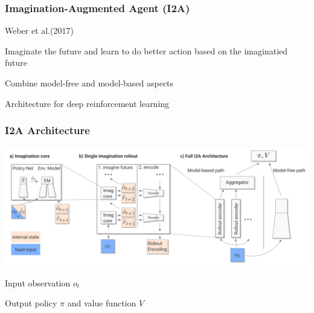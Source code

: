 


\PraesentationMasterWeissBlau 
\begin{frame} 

\end{frame} 

\PraesentationMasterStandard


\begin{frame}
    \frametitle{Imagination-Augmented Agent (I2A)}

\begin{PraesentationAufzaehlung}
	\item Weber et al.(2017)
    \item Imaginate the future and learn to do better action based on the imaginatied future
    \item Combine model-free and model-based aspects
    \item Architecture for deep reinforcement learning
\end{PraesentationAufzaehlung}

\end{frame}
\clearpage

\begin{frame}
    \frametitle{I2A Architecture}


\includegraphics[width=\columnwidth]{./Images/i2a_architecture.png}%
\begin{PraesentationAufzaehlung}
	\item Input observation $o_t$
	\item Output policy $\pi$ and value function $V$
\end{PraesentationAufzaehlung}
    
\end{frame}
\clearpage

